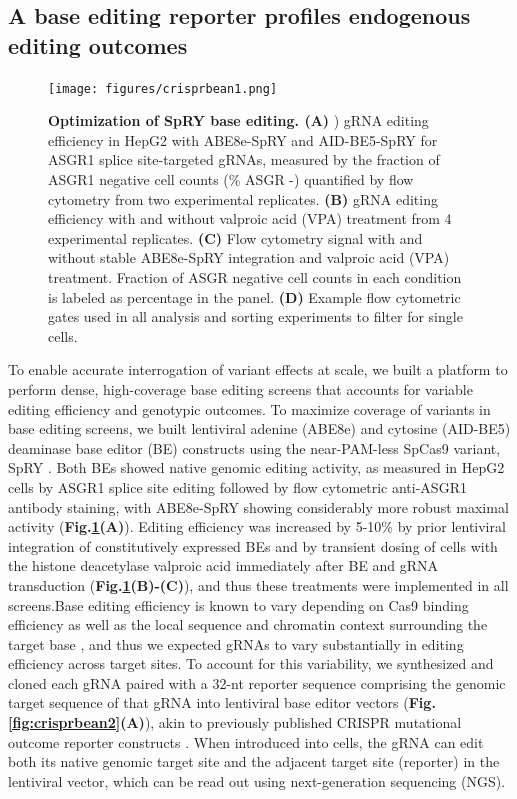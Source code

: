 \documentclass[a4paper, titlepage, openright]{book}
\begin{document}
\subsection{A base editing reporter profiles endogenous editing outcomes}
\begin{figure}
	\centering
	\texttt{[image: figures/crisprbean1.png]}
	\caption[Optimization of SpRY base editing]{\textbf{Optimization of SpRY base editing. (A)} ) gRNA editing efficiency in HepG2 with ABE8e-SpRY and AID-BE5-SpRY for ASGR1 splice site-targeted gRNAs, measured by the fraction of ASGR1 negative cell counts (\% ASGR -) quantified by flow cytometry from two experimental replicates. \textbf{(B)} gRNA editing efficiency with and without valproic acid (VPA) treatment from 4 experimental replicates. \textbf{(C)} Flow cytometry signal with and without stable ABE8e-SpRY integration and valproic acid (VPA) treatment. Fraction of ASGR negative cell counts in each condition is labeled as percentage in the panel.  \textbf{(D)} Example flow cytometric gates used in all analysis and sorting experiments to filter for single cells. }
	\label{fig:crisprbean1}
\end{figure} 
To enable accurate interrogation of variant effects at scale, we built a platform to perform dense, high-coverage base editing screens that accounts for variable editing efficiency and genotypic outcomes. To maximize coverage of variants in base editing screens, we built lentiviral adenine (ABE8e) \citep{gaudelli2017programmable, richter2020phage} and cytosine (AID-BE5) \citep{arbab2020determinants} deaminase base editor (BE) constructs using the near-PAM-less SpCas9 variant, SpRY \citep{walton2020unconstrained}. Both BEs showed native genomic editing activity, as measured in HepG2 cells by ASGR1 splice site editing followed by flow cytometric anti-ASGR1 antibody staining, with ABE8e-SpRY showing considerably more robust maximal activity (\textbf{Fig.\ref{fig:crisprbean1}(A)}). Editing efficiency was increased by 5-10\% by prior lentiviral integration of constitutively expressed BEs and by transient dosing of cells with the histone deacetylase valproic acid immediately after BE and gRNA transduction (\textbf{Fig.\ref{fig:crisprbean1}(B)-(C)}), and thus these treatments were implemented in all screens.Base editing efficiency is known to vary depending on Cas9 binding efficiency as well as the local sequence and chromatin context surrounding the target base \citep{arbab2020determinants, shin2021small, yang2023hmgn1}, and thus we expected gRNAs to vary substantially in editing efficiency across target sites. To account for this variability, we synthesized and cloned each gRNA paired with a 32-nt reporter sequence comprising the genomic target sequence of that gRNA into lentiviral base editor vectors (\textbf{Fig. \ref{fig:crisprbean2}(A)}), akin to previously published CRISPR mutational outcome reporter constructs \citep{sanchez2022base, kim2022high}. When introduced into cells, the gRNA can edit both its native genomic target site and the adjacent target site (reporter) in the lentiviral vector, which can be read out using next-generation sequencing (NGS). 
\end{document}
